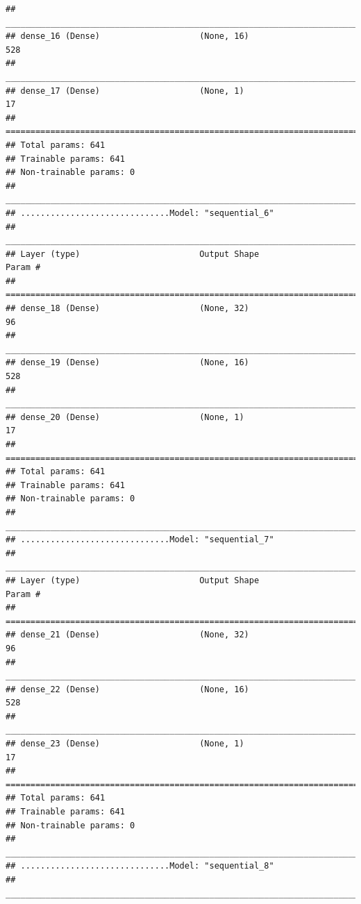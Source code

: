 \documentclass[
]{article}
\begin{document}
\begin{verbatim}
## ________________________________________________________________________________
## dense_16 (Dense)                    (None, 16)                      528         
## ________________________________________________________________________________
## dense_17 (Dense)                    (None, 1)                       17          
## ================================================================================
## Total params: 641
## Trainable params: 641
## Non-trainable params: 0
## ________________________________________________________________________________
## ..............................Model: "sequential_6"
## ________________________________________________________________________________
## Layer (type)                        Output Shape                    Param #     
## ================================================================================
## dense_18 (Dense)                    (None, 32)                      96          
## ________________________________________________________________________________
## dense_19 (Dense)                    (None, 16)                      528         
## ________________________________________________________________________________
## dense_20 (Dense)                    (None, 1)                       17          
## ================================================================================
## Total params: 641
## Trainable params: 641
## Non-trainable params: 0
## ________________________________________________________________________________
## ..............................Model: "sequential_7"
## ________________________________________________________________________________
## Layer (type)                        Output Shape                    Param #     
## ================================================================================
## dense_21 (Dense)                    (None, 32)                      96          
## ________________________________________________________________________________
## dense_22 (Dense)                    (None, 16)                      528         
## ________________________________________________________________________________
## dense_23 (Dense)                    (None, 1)                       17          
## ================================================================================
## Total params: 641
## Trainable params: 641
## Non-trainable params: 0
## ________________________________________________________________________________
## ..............................Model: "sequential_8"
## ________________________________________________________________________________

\end{verbatim}
\end{document}
